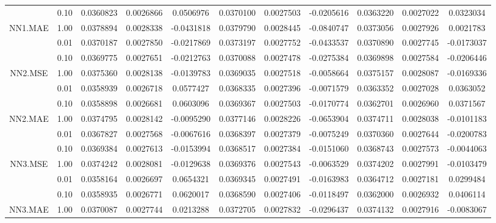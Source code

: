 \begin{longtable}[t]{ccccccccccc}
\cmidrule{2-11}
 & 0.10 & 0.0360823 & 0.0026866 & 0.0506976 & 0.0370100 & 0.0027503 & -0.0205616 & 0.0363220 & 0.0027022 & 0.0323034\\
\cmidrule{2-11}
\multirow{-3}{*}{\centering\arraybackslash NN1.MAE} & 1.00 & 0.0378894 & 0.0028338 & -0.0431818 & 0.0379790 & 0.0028445 & -0.0840747 & 0.0373056 & 0.0027926 & 0.0021783\\
\cmidrule{1-11}
 & 0.01 & 0.0370187 & 0.0027850 & -0.0217869 & 0.0373197 & 0.0027752 & -0.0433537 & 0.0370890 & 0.0027745 & -0.0173037\\
\cmidrule{2-11}
 & 0.10 & 0.0369775 & 0.0027651 & -0.0212763 & 0.0370088 & 0.0027478 & -0.0275384 & 0.0369898 & 0.0027584 & -0.0206446\\
\cmidrule{2-11}
\multirow{-3}{*}{\centering\arraybackslash NN2.MSE} & 1.00 & 0.0375360 & 0.0028138 & -0.0139783 & 0.0369035 & 0.0027518 & -0.0058664 & 0.0375157 & 0.0028087 & -0.0169336\\
\cmidrule{1-11}
 & 0.01 & 0.0358939 & 0.0026718 & 0.0577427 & 0.0368335 & 0.0027396 & -0.0071579 & 0.0363352 & 0.0027028 & 0.0363052\\
\cmidrule{2-11}
 & 0.10 & 0.0358898 & 0.0026681 & 0.0603096 & 0.0369367 & 0.0027503 & -0.0170774 & 0.0362701 & 0.0026960 & 0.0371567\\
\cmidrule{2-11}
\multirow{-3}{*}{\centering\arraybackslash NN2.MAE} & 1.00 & 0.0374795 & 0.0028142 & -0.0095290 & 0.0377146 & 0.0028226 & -0.0653904 & 0.0374711 & 0.0028038 & -0.0101183\\
\cmidrule{1-11}
 & 0.01 & 0.0367827 & 0.0027568 & -0.0067616 & 0.0368397 & 0.0027379 & -0.0075249 & 0.0370360 & 0.0027644 & -0.0200783\\
\cmidrule{2-11}
 & 0.10 & 0.0369384 & 0.0027613 & -0.0153994 & 0.0368517 & 0.0027384 & -0.0151060 & 0.0368743 & 0.0027573 & -0.0044063\\
\cmidrule{2-11}
\multirow{-3}{*}{\centering\arraybackslash NN3.MSE} & 1.00 & 0.0374242 & 0.0028081 & -0.0129638 & 0.0369376 & 0.0027543 & -0.0063529 & 0.0374202 & 0.0027991 & -0.0103479\\
\cmidrule{1-11}
 & 0.01 & 0.0358164 & 0.0026697 & 0.0654321 & 0.0369345 & 0.0027491 & -0.0163983 & 0.0364712 & 0.0027181 & 0.0299484\\
\cmidrule{2-11}
 & 0.10 & 0.0358935 & 0.0026771 & 0.0620017 & 0.0368590 & 0.0027406 & -0.0118497 & 0.0362000 & 0.0026932 & 0.0406114\\
\cmidrule{2-11}
\multirow{-3}{*}{\centering\arraybackslash NN3.MAE} & 1.00 & 0.0370087 & 0.0027744 & 0.0213288 & 0.0372705 & 0.0027832 & -0.0296437 & 0.0374132 & 0.0027916 & -0.0083067\\

\end{longtable}
